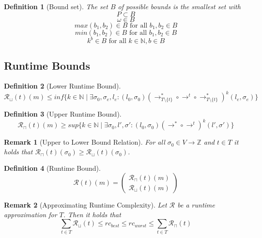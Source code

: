 \documentclass{scrartcl}
\newtheorem{definition}{Definition}
\newtheorem{remark}{Remark}
\begin{document}
\begin{definition}[Bound set]
	The set $B$ of possible bounds is the smallest set with
	\[ P \subset B \] 
	\[ \omega \in B \]
	\[ \mathit{max}(b_1, b_2) \in B \text{ for all } b_1, b_2 \in B \]
	\[ \mathit{min}(b_1, b_2) \in B \text{ for all } b_1, b_2 \in B \]
	\[ k^b \in B \text{ for all } k \in \mathbb{N}, b \in B \]
\end{definition}

\subsection{Runtime Bounds}

\begin{definition}[Lower Runtime Bound]
	\[ \mathcal{R}_\sqcup(t)(m) \leq \mathit{inf} \lbrace k \in \mathbb{N} \mid \exists \sigma_0, \sigma_e, l_e: (l_0, \sigma_0) (\rightarrow^*_{T \setminus \lbrace t \rbrace} \circ \rightarrow^t \circ \rightarrow^*_{T \setminus \lbrace t \rbrace})^k (l_e, \sigma_e) \rbrace \]
\end{definition}

\begin{definition}[Upper Runtime Bound]
	\[ \mathcal{R}_\sqcap(t)(m) \geq \mathit{sup} \lbrace k \in \mathbb{N} \mid \exists \sigma_0, l', \sigma': (l_0, \sigma_0) (\rightarrow^* \circ \rightarrow^t)^k (l', \sigma') \rbrace \]
\end{definition}

\begin{remark}[Upper to Lower Bound Relation]
	For all $\sigma_0 \in V \rightarrow \mathbb{Z}$ and $t \in T$ it holds that $\mathcal{R}_\sqcap(t)(\sigma_0) \geq \mathcal{R}_\sqcup(t)(\sigma_0)$.
\end{remark}

\begin{definition}[Runtime Bound]
	\[ \mathcal{R}(t)(m) = 
		\left( \begin{array}{c}
			\mathcal{R}_\sqcap(t)(m)\\
			\mathcal{R}_\sqcup(t)(m)
		\end{array} \right) \]
\end{definition}

\begin{remark}[Approximating Runtime Complexity]
	Let $\mathcal{R}$ be a runtime approximation for $T$.
	Then it holds that 
	\[ \sum_{t \in T}\mathcal{R}_\sqcup(t) \leq \mathit{rc}_\mathit{best} \leq \mathit{rc}_\mathit{worst} \leq \sum_{t \in T}\mathcal{R}_\sqcap(t) \]
\end{remark}
\end{document}
